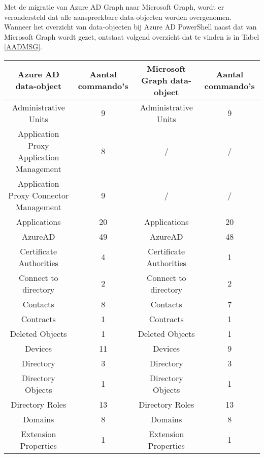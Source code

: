 


Met de migratie van Azure \ac{AD} Graph naar Microsoft Graph, wordt er verondersteld dat alle aanspreekbare data-objecten worden overgenomen. Wanneer het overzicht van data-objecten bij Azure \ac{AD} PowerShell naast dat van Microsoft Graph wordt gezet, ontstaat volgend overzicht dat te vinden is in Tabel \ref{AADMSG}. \\

\begin{table}
    \tiny
    \centering
    \begin{tabular}{ |c|c||c|c| } 
        \hline
        \textbf{Azure AD data-object} & \textbf{Aantal commando's} & \textbf{Microsoft Graph data-object} & \textbf{Aantal commando's} \\
        \hline
        Administrative Units & 9 & Administrative Units & 9 \\ 
        Application Proxy Application Management & 8 & / & / \\
        Application Proxy Connector Management & 9 & / & / \\
        Applications & 20 & Applications & 20 \\ 
        AzureAD & 49 & AzureAD & 48 \\ 
        Certificate Authorities & 4 & Certificate Authorities & 1 \\ 
        Connect to directory & 2 & Connect to directory & 2 \\ 
        Contacts & 8 & Contacts & 7 \\ 
        Contracts & 1 & Contracts & 1 \\ 
        Deleted Objects & 1 & Deleted Objects & 1 \\ 
        Devices & 11 & Devices & 9 \\    
        Directory & 3 & Directory & 3 \\
        Directory Objects & 1 & Directory Objects & 1 \\ 
        Directory Roles & 13 & Directory Roles & 13 \\ 
        Domains & 8 & Domains & 8 \\ 
        Extension Properties & 1 & Extension Properties & 1 \\ 

\end{tabular}
\end{table}
